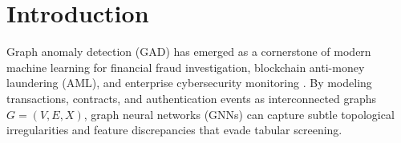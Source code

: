 \documentclass[11pt,a4paper]{article}
\begin{document}
\par

\section{Introduction}
\label{sec:introduction}
Graph anomaly detection (GAD) has emerged as a cornerstone of modern machine learning for financial fraud investigation, blockchain anti-money laundering (AML), and enterprise cybersecurity monitoring \cite{ma2023survey,qiao2025survey,dilini2026comprehensive}. By modeling transactions, contracts, and authentication events as interconnected graphs $G=(V, E, X)$, graph neural networks (GNNs) can capture subtle topological irregularities and feature discrepancies that evade tabular screening.
\end{document}
